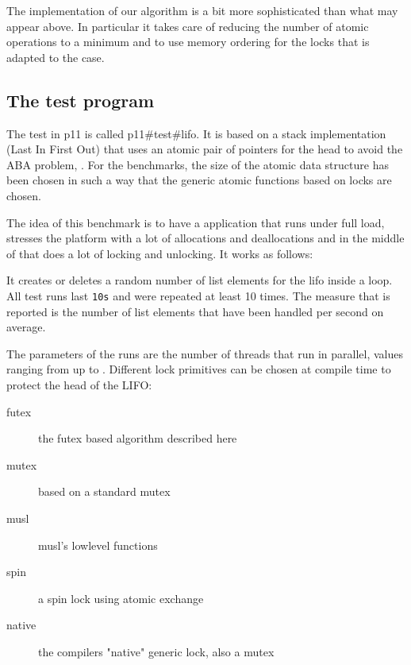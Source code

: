 The implementation of our algorithm is a bit more sophisticated
than what may appear above. In particular it takes care of reducing
the number of atomic operations to a minimum and to use memory
ordering for the locks that is adapted to the case.

\subsection{The test program}
\label{sec-4-2}

The test in p11 is called p11\#test\#lifo. It is based on a stack
implementation (Last In First Out) that uses an atomic pair of
pointers for the head to avoid the ABA problem,
\cite{IBM370,michael04:aba}. For the benchmarks, the size of the atomic
data structure has been chosen in such a way that the generic
atomic functions based on locks are chosen.

The idea of this benchmark is to have a application that runs under
full load, stresses the platform with a lot of allocations and
deallocations and in the middle of that does a lot of locking and
unlocking. It works as follows:

It creates or deletes a random number of list elements for the lifo
inside a loop. All test runs last \texttt{10s} and were repeated at least
10 times. The measure that is reported is the number of list
elements that have been handled per second on average.

The parameters of the runs are the number of threads that run in
parallel, values ranging from  up to .  Different lock
primitives can be chosen at compile time to protect the head of the
LIFO:\itemadjust

\begin{description}
\item[{futex}] the futex based algorithm described here
\item[{mutex}] based on a standard mutex
\item[{musl}] musl's lowlevel  functions
\item[{spin}] a spin lock using atomic exchange
\item[{native}] the compilers "native" generic lock, also a mutex
\end{description}

